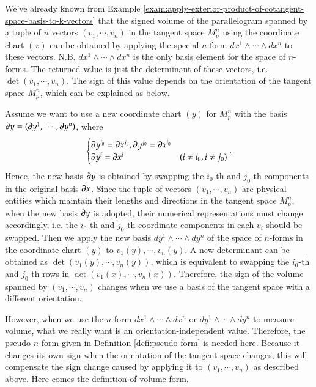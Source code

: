 \documentclass[11pt, a4paper]{book}
\begin{document}
We've already known from Example
\ref{exam:apply-exterior-product-of-cotangent-space-basis-to-k-vectors} that the signed
volume of the parallelogram spanned by a tuple of $n$ vectors $(v_1,\cdots,v_n)$ in the
tangent space $M_{p}^n$ using the coordinate chart $(x)$ can be obtained by applying
the special $n$-form $dx^1 \wedge \cdots \wedge dx^n$ to these vectors. N.B.
$dx^1 \wedge \cdots \wedge dx^n$ is the only basis element for the space of $n$-forms. The
returned value is just the determinant of these vectors, i.e. $\det(v_1,\cdots,v_n)$. The
sign of this value depends on the orientation of the tangent space $M_p^n$, which can
be explained as below.

Assume we want to use a new coordinate chart $(y)$ for $M_{p}^n$ with the basis
$\boldsymbol{\partial}y = (\boldsymbol{\partial}y^1,\cdots,\boldsymbol{\partial}y^n)$, where
\begin{equation*}
  \begin{cases}
    \boldsymbol{\partial}y^{i_0} = \boldsymbol{\partial}x^{j_0}, \boldsymbol{\partial}y^{j_0} =
    \boldsymbol{\partial}x^{i_0} \\
    \boldsymbol{\partial}y^i = \boldsymbol{\partial}x^i & (i \neq i_0, i\neq j_0)
  \end{cases}.
\end{equation*}
Hence, the new basis $\boldsymbol{\partial}y$ is obtained by swapping the $i_0$-th and $j_0$-th
components in the original basis $\boldsymbol{\partial}x$. Since the tuple of vectors
$(v_1,\cdots,v_n)$ are physical entities which maintain their lengths and directions in
the tangent space $M_p^n$, when the new basis $\boldsymbol{\partial}y$ is adopted, their numerical
representations must change accordingly, i.e. the $i_0$-th and $j_0$-th coordinate
components in each $v_i$ should be swapped. Then we apply the new basis
$dy^1 \wedge \cdots \wedge dy^n$ of the space of $n$-forms in the coordinate chart $(y)$
to $v_1(y),\cdots,v_n(y)$. A new determinant can be obtained as
$\det(v_1(y),\cdots,v_n(y))$, which is equivalent to swapping the $i_0$-th and $j_0$-th
rows in $\det(v_1(x),\cdots,v_n(x))$. Therefore, the sign of the volume spanned by
$(v_1,\cdots,v_n)$ changes when we use a basis of the tangent space with a different
orientation.

However, when we use the $n$-form $dx^1 \wedge \cdots \wedge dx^n$ or
$dy^1 \wedge \cdots \wedge dy^n$ to measure volume, what we really want is an
orientation-independent value. Therefore, the pseudo $n$-form given in Definition
\ref{defi:pseudo-form} is needed here. Because it changes its own sign when the
orientation of the tangent space changes, this will compensate the sign change caused by
applying it to $(v_1,\cdots,v_n)$ as described above. Here comes the definition of
volume form.
\end{document}
